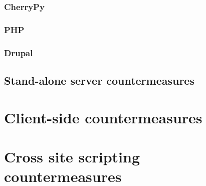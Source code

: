 \subsubsection{CherryPy}


\subsubsection{PHP}

\subsubsection{Drupal}



\subsection{Stand-alone server countermeasures}\label{standalone-server}

\section{Client-side countermeasures}

\section{Cross site scripting countermeasures}\label{xss-countermeasures}

